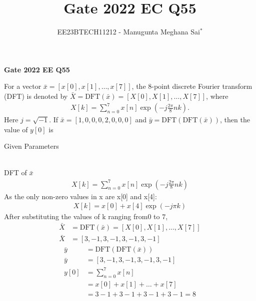 \documentclass[journal,12pt,onecolumn]{IEEEtran}
\theoremstyle{remark}
\begin{document}
    
    
    \vspace{3cm}
    
    \title{Gate 2022 EC Q55}
    \author{EE23BTECH11212 - Manugunta Meghana Sai$^{*}$%
    }
    \maketitle
    \bigskip
    
    \renewcommand{\thefigure}{\theenumi}
    \renewcommand{\thetable}{\theenumi}
    
    \vspace{3cm}
    \textbf{Gate 2022 EE Q55} 
    
    For a vector $\bar{x} = [x[0], x[1], \dots, x[7] ]$, the $8$-point discrete Fourier transform (DFT) is denoted by $\bar{X} = \text{DFT}(\bar{x}) = [X[0],X[1],\dots,X[7]]$, where
    \begin{align*}
    X[k] = \sum_{n=0}^{7}x[n]\exp\left(-j\frac{2\pi}{8}nk\right).
    \end{align*} 
    Here $j = \sqrt{-1}$. If $\bar{x} = [1,0,0,0,2,0,0,0]$ and $\bar{y} = \text{DFT}(\text{DFT}(\bar{x}))$, then the value of $y[0]$ is\\
    \solution
    \begin{table}[h!]
 	\centering
 	\resizebox{6 cm}{!}{
 		
 	}
 	\caption{Given Parameters}
 	\label{tab:msmECgate55tab1} 
 \end{table} 
    \\DFT of $\bar{x}$
    \begin{align}
    X[k] = \sum_{n=0}^{7}x[n]\exp\left(-j\frac{2\pi}{8}nk\right)
    \end{align}
    As the only non-zero values in x are x[0] and x[4]:
    \begin{align}
    X[k] = x[0] + x[4]\exp\left(-j\pi k\right)
    \end{align}
    After substituting the values of k ranging from$0$ to $7$,
    \begin{align}
    \bar{X} &= \text{DFT}(\bar{x}) = [X[0],X[1],\dots,X[7]]\\
    \bar{X} &= [3,-1,3,-1,3,-1,3,-1]
    \end{align}
    \begin{align}
    \bar{y} &= \text{DFT}(\text{DFT}(\bar{x}))\\
    \bar{y} &= [3,-1,3,-1,3,-1,3,-1]\\
    y[0] &= \sum_{n=0}^{7}x[n]\\
    &= x[0] + x[1] + \dots + x[7]\\
    &= 3 -1 +3 -1 +3 -1 +3 -1 = 8
    \end{align}
\end{document}
